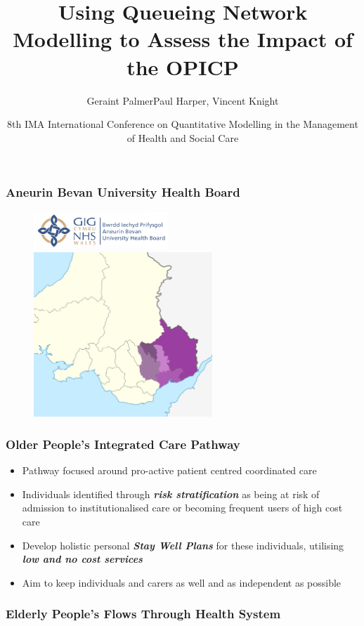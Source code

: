 \documentclass[xcolor={table}]{beamer}
\title
{Using Queueing Network Modelling to Assess the Impact of the OPICP}
\author{Geraint Palmer\newline \scriptsize{Paul Harper, Vincent Knight}}
\date{8th IMA International Conference on Quantitative Modelling in the Management of Health and Social Care}
\begin{document}
\frame{\titlepage}


\begin{frame}
\frametitle{Aneurin Bevan University Health Board}
\begin{figure}
\includegraphics[width=0.45\textwidth]{ABUHBlogo}\\
\includegraphics[width=0.6\textwidth]{Aneurin_Bevan}
\end{figure}
\end{frame}

\begin{frame}
\frametitle{Older People's Integrated Care Pathway}
\begin{itemize}
  \item Pathway focused around pro-active patient centred coordinated care
  \item Individuals identified through \textit{\textbf{risk stratification}} as being at risk of admission to institutionalised care or becoming frequent users of high cost care
  \item Develop holistic personal \textit{\textbf{Stay Well Plans}} for these individuals, utilising \textit{\textbf{low and no cost services}}
  \item Aim to keep individuals and carers as well and as independent as possible
\end{itemize}
\end{frame}

\begin{frame}
\frametitle{Elderly People's Flows Through Health System}
\end{frame}
\end{document}
